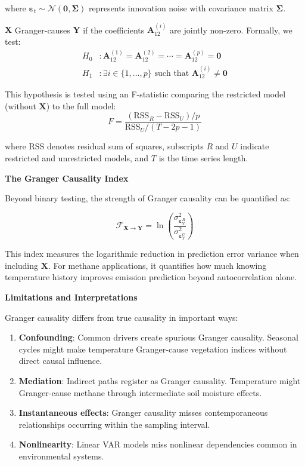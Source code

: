 where $\boldsymbol{\varepsilon}_t \sim \mathcal{N}(\mathbf{0}, \boldsymbol{\Sigma})$ represents innovation noise with covariance matrix $\boldsymbol{\Sigma}$.

$\mathbf{X}$ Granger-causes $\mathbf{Y}$ if the coefficients $\mathbf{A}_{12}^{(i)}$ are jointly non-zero. Formally, we test:
\begin{align}
	H_0 & : \mathbf{A}_{12}^{(1)} = \mathbf{A}_{12}^{(2)} = \cdots = \mathbf{A}_{12}^{(p)} = \mathbf{0} \\
	H_1 & : \exists i \in \{1, \ldots, p\} \text{ such that } \mathbf{A}_{12}^{(i)} \neq \mathbf{0}
\end{align}

This hypothesis is tested using an F-statistic comparing the restricted model (without $\mathbf{X}$) to the full model:
\begin{equation}
	F = \frac{(\text{RSS}_R - \text{RSS}_U)/p}{\text{RSS}_U/(T-2p-1)}
\end{equation}

where $\text{RSS}$ denotes residual sum of squares, subscripts $R$ and $U$ indicate restricted and unrestricted models, and $T$ is the time series length.

\textbf{The Granger Causality Index}

Beyond binary testing, the strength of Granger causality can be quantified as:

\begin{equation}
	\mathcal{F}_{\mathbf{X} \rightarrow \mathbf{Y}} = \ln\left(\frac{\sigma^2_{\boldsymbol{\varepsilon}_Y^R}}{\sigma^2_{\boldsymbol{\varepsilon}_Y^U}}\right)
\end{equation}

This index measures the logarithmic reduction in prediction error variance when including $\mathbf{X}$. For methane applications, it quantifies how much knowing temperature history improves emission prediction beyond autocorrelation alone.

\textbf{Limitations and Interpretations}

Granger causality differs from true causality in important ways:

\begin{enumerate}
	\item \textbf{Confounding}: Common drivers create spurious Granger causality. Seasonal cycles might make temperature Granger-cause vegetation indices without direct causal influence.

	\item \textbf{Mediation}: Indirect paths register as Granger causality. Temperature might Granger-cause methane through intermediate soil moisture effects.

	\item \textbf{Instantaneous effects}: Granger causality misses contemporaneous relationships occurring within the sampling interval.

	\item \textbf{Nonlinearity}: Linear VAR models miss nonlinear dependencies common in environmental systems.
\end{enumerate}

